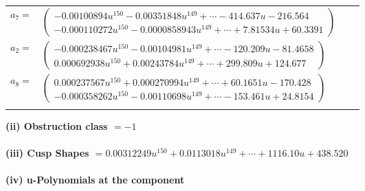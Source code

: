\documentclass[1p]{elsarticle_modified}
\theoremstyle{definition}
\begin{document}
\begin{tabular}{m{7pt} m{180pt} m{7pt} m{180pt} }
\flushright $a_{7}=$&$\begin{pmatrix}-0.00100894 u^{150}-0.00351848 u^{149}+\cdots-414.637 u-216.564\\-0.000110272 u^{150}-0.0000858943 u^{149}+\cdots+7.81534 u+60.3391\end{pmatrix}$ \\
\flushright $a_{2}=$&$\begin{pmatrix}-0.000238467 u^{150}-0.00104981 u^{149}+\cdots-120.209 u-81.4658\\0.000692938 u^{150}+0.00243784 u^{149}+\cdots+299.809 u+124.677\end{pmatrix}$ \\
\flushright $a_{8}=$&$\begin{pmatrix}0.000237567 u^{150}+0.000270994 u^{149}+\cdots+60.1651 u-170.428\\-0.000358262 u^{150}-0.00110698 u^{149}+\cdots-153.461 u+24.8154\end{pmatrix}$\\&\end{tabular}
\flushleft \textbf{(ii) Obstruction class $= -1$}\\~\\
\flushleft \textbf{(iii) Cusp Shapes $= 0.00312249 u^{150}+0.0113018 u^{149}+\cdots+1116.10 u+438.520$}\\~\\
\newpage\renewcommand{\arraystretch}{1}
\flushleft \textbf{(iv) u-Polynomials at the component}\newline \\
\end{document}
